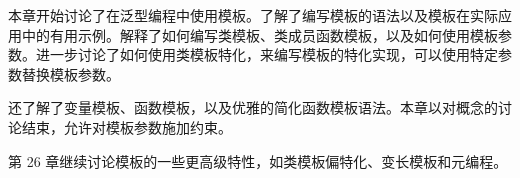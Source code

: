 本章开始讨论了在泛型编程中使用模板。了解了编写模板的语法以及模板在实际应用中的有用示例。解释了如何编写类模板、类成员函数模板，以及如何使用模板参数。进一步讨论了如何使用类模板特化，来编写模板的特化实现，可以使用特定参数替换模板参数。

还了解了变量模板、函数模板，以及优雅的简化函数模板语法。本章以对概念的讨论结束，允许对模板参数施加约束。

第 26 章继续讨论模板的一些更高级特性，如类模板偏特化、变长模板和元编程。
